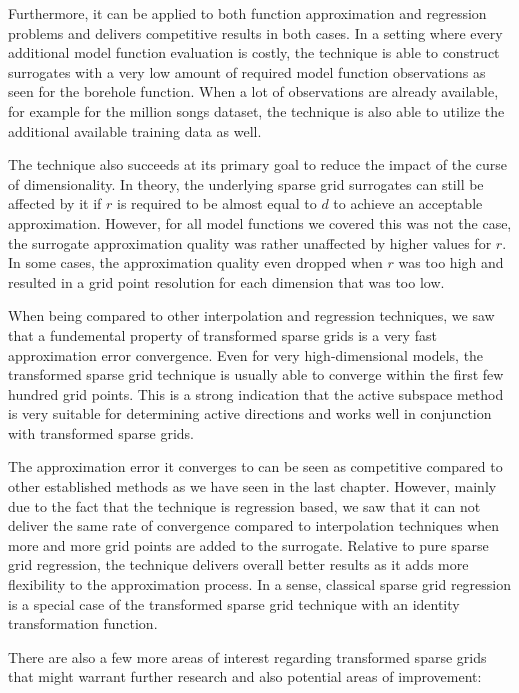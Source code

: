 \documentclass[
  a4paper,  %
  twoside,  %
  bibliography=totoc,
  headsepline,
  cleardoublepage=empty,
  parskip=half,
  draft=false
]{scrbook}
\begin{document}
Furthermore, it can be applied to both function approximation and regression problems and delivers competitive results in both cases.
In a setting where every additional model function evaluation is costly, the technique is able to construct surrogates with a very low amount of required model function observations as seen for the borehole function.
When a lot of observations are already available, for example for the million songs dataset, the technique is also able to utilize the additional available training data as well.

The technique also succeeds at its primary goal to reduce the impact of the curse of dimensionality.
In theory, the underlying sparse grid surrogates can still be affected by it if $r$ is required to be almost equal to $d$ to achieve an acceptable approximation.
However, for all model functions we covered this was not the case, \ie the surrogate approximation quality was rather unaffected by higher values for $r$.
In some cases, the approximation quality even dropped when $r$ was too high and resulted in a grid point resolution for each dimension that was too low.

When being compared to other interpolation and regression techniques, we saw that a fundemental property of transformed sparse grids is a very fast approximation error convergence.
Even for very high-dimensional models, the transformed sparse grid technique is usually able to converge within the first few hundred grid points.
This is a strong indication that the active subspace method is very suitable for determining active directions and works well in conjunction with transformed sparse grids.

The approximation error it converges to can be seen as competitive compared to other established methods as we have seen in the last chapter.
However, mainly due to the fact that the technique is regression based, we saw that it can not deliver the same rate of convergence compared to interpolation techniques when more and more grid points are added to the surrogate.
Relative to pure sparse grid regression, the technique delivers overall better results as it adds more flexibility to the approximation process.
In a sense, classical sparse grid regression is a special case of the transformed sparse grid technique with an identity transformation function.

There are also a few more areas of interest regarding transformed sparse grids that might warrant further research and also potential areas of improvement:
\end{document}

